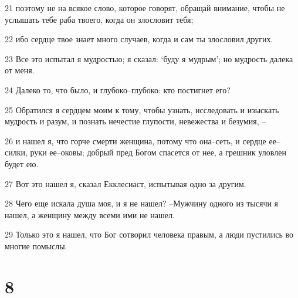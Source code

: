 \par 21 поэтому не на всякое слово, которое говорят, обращай внимание, чтобы не услышать тебе раба твоего, когда он злословит тебя;
\par 22 ибо сердце твое знает много случаев, когда и сам ты злословил других.
\par 23 Все это испытал я мудростью; я сказал: `буду я мудрым'; но мудрость далека от меня.
\par 24 Далеко то, что было, и глубоко--глубоко: кто постигнет его?
\par 25 Обратился я сердцем моим к тому, чтобы узнать, исследовать и изыскать мудрость и разум, и познать нечестие глупости, невежества и безумия, --
\par 26 и нашел я, что горче смерти женщина, потому что она--сеть, и сердце ее--силки, руки ее--оковы; добрый пред Богом спасется от нее, а грешник уловлен будет ею.
\par 27 Вот это нашел я, сказал Екклесиаст, испытывая одно за другим.
\par 28 Чего еще искала душа моя, и я не нашел? --Мужчину одного из тысячи я нашел, а женщину между всеми ими не нашел.
\par 29 Только это я нашел, что Бог сотворил человека правым, а люди пустились во многие помыслы.

\chapter{8}

